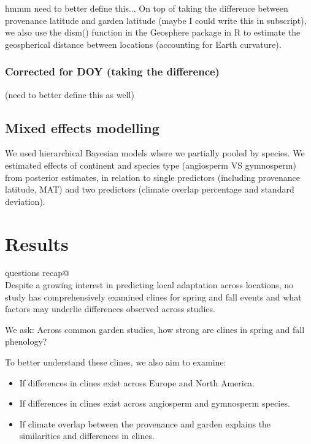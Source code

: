 \documentclass{article}
\begin{document}
hmmm need to better define this... 
On top of taking the difference between provenance latitude and garden latitude (maybe I could write this in subscript), we also use the dism() function in the Geosphere package in R to estimate the geospherical distance between locations (accounting for Earth curvature).

\subsubsection{Corrected for DOY (taking the difference)}
(need to better define this as well)



\subsection{Mixed effects modelling}

We used hierarchical Bayesian models where we partially pooled by species. We estimated effects of continent and species type (angiosperm VS gymnosperm) from posterior estimates, in relation to single predictors (including provenance latitude, MAT) and two predictors (climate overlap percentage and standard deviation). 


\section{Results}

\verb@Research questions recap@
\\
Despite a growing interest in predicting local adaptation across locations, no study has comprehensively examined clines for spring and fall events and what factors may underlie differences observed across studies.

We ask: Across common garden studies, how strong are clines in spring and fall phenology?

To better understand these clines, we also aim to examine:
\begin{itemize}
\item If differences in clines exist across Europe and North America.
\item If differences in clines exist across angiosperm and gymnosperm species.
\item If climate overlap between the provenance and garden explains the similarities and differences in clines.
\end{itemize}
\end{document}
